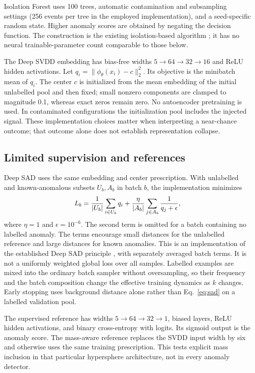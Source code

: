 \documentclass[reprint,aps,pra,amsmath,amssymb,floatfix,raggedbottom]{revtex4-2}
\begin{document}
Isolation Forest uses 100 trees, automatic contamination and subsampling settings (256 events per tree in the employed implementation), and a seed-specific random state. Higher anomaly scores are obtained by negating the decision function. The construction is the existing isolation-based algorithm \cite{iforest}; it has no neural trainable-parameter count comparable to those below.

The Deep SVDD embedding has bias-free widths $5\to64\to32\to16$ and ReLU hidden activations. Let $q_i=\|\phi_\theta(x_i)-c\|_2^2$. Its objective is the minibatch mean of $q_i$. The center $c$ is initialized from the mean embedding of the initial unlabelled pool and then fixed; small nonzero components are clamped to magnitude 0.1, whereas exact zeros remain zero. No autoencoder pretraining is used. In contaminated configurations the initialization pool includes the injected signal. These implementation choices matter when interpreting a near-chance outcome; that outcome alone does not establish representation collapse.

\subsection{Limited supervision and references}
Deep SAD uses the same embedding and center prescription. With unlabelled and known-anomalous subsets $U_b,A_b$ in batch $b$, the implementation minimizes
\begin{equation}\label{eq:sad}
 L_b={1\over|U_b|}\sum_{i\in U_b}q_i+
 {\eta\over|A_b|}\sum_{j\in A_b}{1\over q_j+\epsilon},
\end{equation}
where $\eta=1$ and $\epsilon=10^{-6}$. The second term is omitted for a batch containing no labelled anomaly. The terms encourage small distances for the unlabelled reference and large distances for known anomalies. This is an implementation of the established Deep SAD principle \cite{sad}, with separately averaged batch terms. It is not a uniformly weighted global loss over all samples. Labelled examples are mixed into the ordinary batch sampler without oversampling, so their frequency and the batch composition change the effective training dynamics as $k$ changes. Early stopping uses background distance alone rather than Eq.~\eqref{eq:sad} on a labelled validation pool.

The supervised reference has widths $5\to64\to32\to1$, biased layers, ReLU hidden activations, and binary cross-entropy with logits. Its sigmoid output is the anomaly score. The mass-aware reference replaces the SVDD input width by six and otherwise uses the same training prescription. This tests explicit mass inclusion in that particular hypersphere architecture, not in every anomaly detector.
\end{document}
